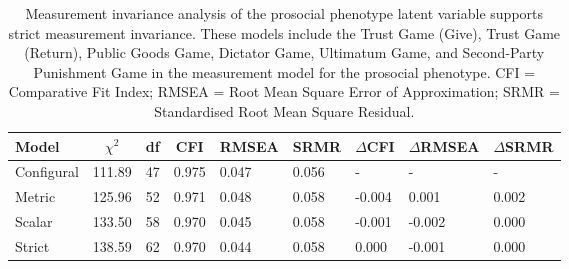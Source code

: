 \documentclass[
  man,floatsintext]{apa6}
\begin{document}
\begin{table}[H]

\begin{center}
\begin{threeparttable}

\caption{\label{tab:tableCompareMIFull}Measurement invariance analysis of the
prosocial phenotype latent variable supports strict measurement invariance.
These models include the Trust Game (Give), Trust Game (Return), Public Goods
Game, Dictator Game, Ultimatum Game, and Second-Party Punishment Game in the
measurement model for the prosocial phenotype. CFI = Comparative Fit Index;
RMSEA = Root Mean Square Error of Approximation; SRMR = Standardised Root Mean
Square Residual.}

\begin{tabular}{lllllllll}
\toprule
Model & \multicolumn{1}{c}{$\chi^2$} & \multicolumn{1}{c}{df} & \multicolumn{1}{c}{CFI} & \multicolumn{1}{c}{RMSEA} & \multicolumn{1}{c}{SRMR} & \multicolumn{1}{c}{$\Delta$CFI} & \multicolumn{1}{c}{$\Delta$RMSEA} & \multicolumn{1}{c}{$\Delta$SRMR}\\
\midrule
Configural & 111.89 & 47 & 0.975 & 0.047 & 0.056 & - & - & -\\
Metric & 125.96 & 52 & 0.971 & 0.048 & 0.058 & -0.004 & 0.001 & 0.002\\
Scalar & 133.50 & 58 & 0.970 & 0.045 & 0.058 & -0.001 & -0.002 & 0.000\\
Strict & 138.59 & 62 & 0.970 & 0.044 & 0.058 & 0.000 & -0.001 & 0.000\\
\bottomrule
\end{tabular}

\end{threeparttable}
\end{center}

\end{table}
\end{document}

